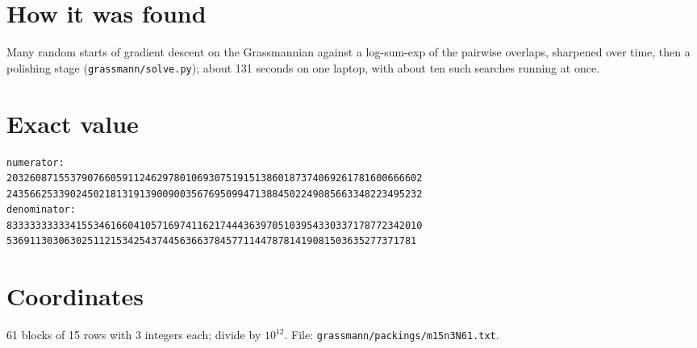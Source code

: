 \documentclass[11pt,a4paper]{article}
\begin{document}
\section{How it was found}
Many random starts of gradient descent on the Grassmannian against a log-sum-exp of the pairwise overlaps, sharpened over time, then a polishing stage (\texttt{grassmann/solve.py}); about 131 seconds on one laptop, with about ten such searches running at once.


\appendix
\section{Exact value}
{\small
\begin{verbatim}
numerator:
203260871553790766059112462978010693075191513860187374069261781600666602
243566253390245021813191390090035676950994713884502249085663348223495232
denominator:
833333333334155346166041057169741162174443639705103954330337178772342010
53691130306302511215342543744563663784577114478781419081503635277371781
\end{verbatim}}

\section{Coordinates}
61 blocks of 15 rows with 3 integers each; divide by $10^{12}$. File: \texttt{grassmann/packings/m15n3N61.txt}.
{\tiny
\begin{multicols}{3}
\end{multicols}}
\end{document}
